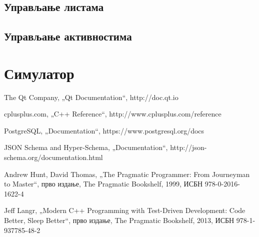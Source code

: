 \documentclass[a4paper, 12pt, diplomski]{etfcyr}
\def\quote#1{„#1“}
\begin{document}
			\subsection{Управљање листама}

			\subsection{Управљање активностима}


		\section{Симулатор}


	\begin{thebibliography}{9}
		The Qt Company, \quote{Qt Documentation},
		http://doc.qt.io

		cplusplus.com, \quote{C++ Reference},
		http://www.cplusplus.com/reference

		PostgreSQL, \quote{Documentation},
		https://www.postgresql.org/docs

		JSON Schema and Hyper-Schema, \quote{Documentation},
		http://json-schema.org/documentation.html

		Andrew Hunt, David Thomas, \quote{The Pragmatic Programmer: From Journeyman to Master},
		прво издање, The Pragmatic Bookshelf, 1999, ИСБН 978-0-2016-1622-4
		
		Jeff Langr, \quote{Modern C++ Programming with Test-Driven Development: Code Better, Sleep Better},
		прво издање, The Pragmatic Bookshelf, 2013, ИСБН 978-1-937785-48-2
	\end{thebibliography}
\end{document}

